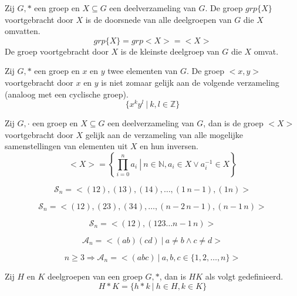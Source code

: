 \documentclass[main.tex]{subfiles}
\begin{document}
\begin{de}
Zij $G,*$ een groep en $X \subseteq G$ een deelverzameling van $G$.
De groep $grp\{X\}$ voortgebracht door $X$ is de doorsnede van alle deelgroepen van $G$ die $X$ omvatten. 
\[ grp\{X\} = grp<X> = <X> \]
De groep voortgebracht door $X$ is de kleinste deelgroep van $G$ die $X$ omvat.
\end{de}

\begin{opm}
Zij $G,*$ een groep en $x$ en $y$ twee elementen van $G$.
De groep $<x,y>$ voortgebracht door $x$ en $y$ is niet zomaar gelijk aan de volgende verzameling (analoog met een cyclische groep).
\[ \{ x^{k}y^{l}\ |\ k,l\in \mathbb{Z} \} \]
\end{opm}

\begin{ei}
Zij $G,\cdot$ een groep en $X \subseteq G$ een deelverzameling van $G$, dan is de groep $<X>$ voortgebracht door $X$ gelijk aan de verzameling van alle mogelijke samenstellingen van elementen uit $X$ en hun inversen.
\[ <X> = \left\{ \prod_{i=0}^{n}a_{i} \ \left|\ n\in \mathbb{N}, a_{i}\in X \vee a_{i}^{-1} \in X \right.\right\}\]
\end{ei}

\begin{pr}
\[ \mathcal{S}_n = <(12),(13),(14),\dotsc, (1\, n-1), (1n)> \]
\end{pr}

\begin{pr}
\[ \mathcal{S}_n = <(12),(23),(34),\dotsc, (n-2\, n-1), (n-1\,n)> \]
\end{pr}

\begin{pr}
\[ \mathcal{S}_n = <(12), (123\dotsc n-1\,n)> \]
\end{pr}

\begin{pr}
\[ \mathcal{A}_n = <(ab)(cd)\ |\ a\neq b \wedge c \neq d> \]
\end{pr}

\begin{pr}
\[ n \ge 3 \Rightarrow \mathcal{A}_n = <(abc)\ |\ a,b,c \in \{1,2,\dotsc,n\}> \]
\end{pr}

\begin{de}
Zij $H$ en $K$ deelgroepen van een groep $G,*$, dan is $HK$ als volgt gedefinieerd.
\[ H*K = \{ h*k\ |\ h\in H, k\in K \} \]
\end{de}
\end{document}
